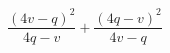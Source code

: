 \begin{ex}[type=expression]
	\begin{condition}
		\( \dfrac{(4v-q)^2}{4q-v}+\dfrac{(4q-v)^2}{4v-q} \)
	\end{condition}
\end{ex}